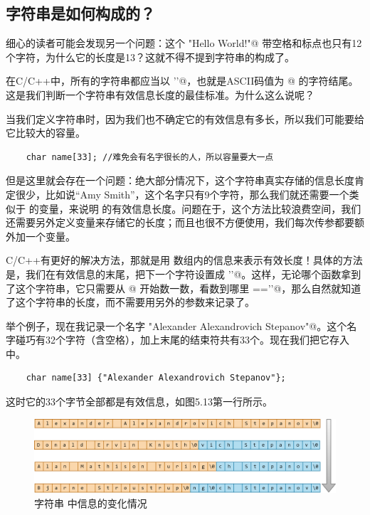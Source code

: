 \subsection*{字符串是如何构成的？}
细心的读者可能会发现另一个问题：这个 \lstinline@"Hello World!"@ 带空格和标点也只有12个字符，为什么它的长度是13？这就不得不提到字符串的构成了。\par
在C/C++中，所有的字符串都应当以 \lstinline@'\0'@，也就是ASCII码值为 @ 的字符结尾。这是我们判断一个字符串有效信息长度的最佳标准。为什么这么说呢？\par
当我们定义字符串时，因为我们也不确定它的有效信息有多长，所以我们可能要给它比较大的容量。
\begin{lstlisting}
    char name[33]; //难免会有名字很长的人，所以容量要大一点
\end{lstlisting}
但是这里就会存在一个问题：绝大部分情况下，这个字符串真实存储的信息长度肯定很少，比如说``Amy Smith''，这个名字只有9个字符，那么我们就还需要一个类似于 \lstinline@size@ 的变量，来说明 \lstinline@name@ 的有效信息长度。问题在于，这个方法比较浪费空间，我们还需要另外定义变量来存储它的长度；而且也很不方便使用，我们每次传参都要额外加一个变量。\par
C/C++有更好的解决方法，那就是用 \lstinline@name@ 数组内的信息来表示有效长度！具体的方法是，我们在有效信息的末尾，把下一个字符设置成 \lstinline@'\0'@。这样，无论哪个函数拿到了这个字符串，它只需要从 \lstinline@name[0]@ 开始数一数，看数到哪里 \lstinline@name[i]=='\0'@，那么自然就知道了这个字符串的长度，而不需要用另外的参数来记录了。\par
举个例子，现在我记录一个名字 \lstinline@"Alexander Alexandrovich Stepanov"@。这个名字碰巧有32个字符（含空格），加上末尾的结束符共有33个。现在我们把它存入 \lstinline@name@ 中。
\begin{lstlisting}
    char name[33] {"Alexander Alexandrovich Stepanov"};
\end{lstlisting}
这时它的33个字节全部都是有效信息，如图5.13第一行所示。\par
\begin{figure}[htbp]
    \centering
    \includegraphics[width=\textwidth]{../images/generalized_parts/05_Information_in_the_string.png}
    \caption{字符串 \lstinline@name@ 中信息的变化情况}
\end{figure}
